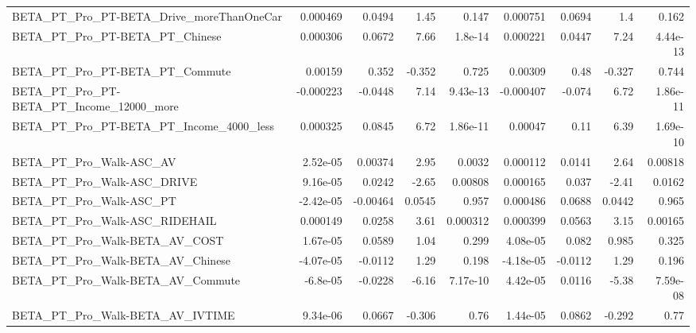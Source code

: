 \begin{tabular}{lrrrrrrrr}
BETA\_PT\_Pro\_PT-BETA\_Drive\_moreThanOneCar           &    0.000469 &       0.0494 &      1.45 &    0.147 &   0.000751 &      0.0694 &          1.4 &         0.162 \\
BETA\_PT\_Pro\_PT-BETA\_PT\_Chinese                     &    0.000306 &       0.0672 &      7.66 &  1.8e-14 &   0.000221 &      0.0447 &         7.24 &      4.44e-13 \\
BETA\_PT\_Pro\_PT-BETA\_PT\_Commute                     &     0.00159 &        0.352 &    -0.352 &    0.725 &    0.00309 &        0.48 &       -0.327 &         0.744 \\
BETA\_PT\_Pro\_PT-BETA\_PT\_Income\_12000\_more           &   -0.000223 &      -0.0448 &      7.14 & 9.43e-13 &  -0.000407 &      -0.074 &         6.72 &      1.86e-11 \\
BETA\_PT\_Pro\_PT-BETA\_PT\_Income\_4000\_less            &    0.000325 &       0.0845 &      6.72 & 1.86e-11 &    0.00047 &        0.11 &         6.39 &      1.69e-10 \\
BETA\_PT\_Pro\_Walk-ASC\_AV                            &    2.52e-05 &      0.00374 &      2.95 &   0.0032 &   0.000112 &      0.0141 &         2.64 &       0.00818 \\
BETA\_PT\_Pro\_Walk-ASC\_DRIVE                         &    9.16e-05 &       0.0242 &     -2.65 &  0.00808 &   0.000165 &       0.037 &        -2.41 &        0.0162 \\
BETA\_PT\_Pro\_Walk-ASC\_PT                            &   -2.42e-05 &     -0.00464 &    0.0545 &    0.957 &   0.000486 &      0.0688 &       0.0442 &         0.965 \\
BETA\_PT\_Pro\_Walk-ASC\_RIDEHAIL                      &    0.000149 &       0.0258 &      3.61 & 0.000312 &   0.000399 &      0.0563 &         3.15 &       0.00165 \\
BETA\_PT\_Pro\_Walk-BETA\_AV\_COST                      &    1.67e-05 &       0.0589 &      1.04 &    0.299 &   4.08e-05 &       0.082 &        0.985 &         0.325 \\
BETA\_PT\_Pro\_Walk-BETA\_AV\_Chinese                   &   -4.07e-05 &      -0.0112 &      1.29 &    0.198 &  -4.18e-05 &     -0.0112 &         1.29 &         0.196 \\
BETA\_PT\_Pro\_Walk-BETA\_AV\_Commute                   &    -6.8e-05 &      -0.0228 &     -6.16 & 7.17e-10 &   4.42e-05 &      0.0116 &        -5.38 &      7.59e-08 \\
BETA\_PT\_Pro\_Walk-BETA\_AV\_IVTIME                    &    9.34e-06 &       0.0667 &    -0.306 &     0.76 &   1.44e-05 &      0.0862 &       -0.292 &          0.77 \\

\end{tabular}
